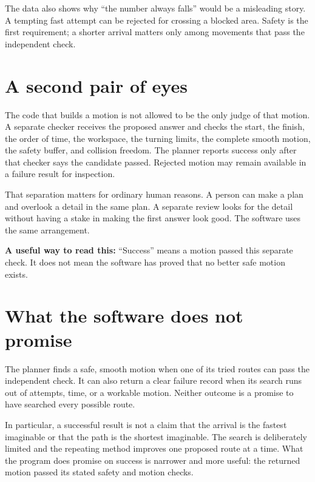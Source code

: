 \documentclass[10pt,letterpaper]{article}
\newcommand{\teachingnote}[1]{\begin{center}\begin{minipage}{.88\linewidth}\colorbox{papergray}{\parbox{.94\linewidth}{\small\textbf{A useful way to read this:} #1}}\end{minipage}\end{center}}
\begin{document}
The data also shows why ``the number always falls'' would be a misleading story.
A tempting fast attempt can be rejected for crossing a blocked area. Safety is
the first requirement; a shorter arrival matters only among movements that
pass the independent check.

\section{A second pair of eyes}

The code that builds a motion is not allowed to be the only judge of that
motion. A separate checker receives the proposed answer and checks the start,
the finish, the order of time, the workspace, the turning limits, the complete
smooth motion, the safety buffer, and collision freedom. The planner reports success only after that checker says the candidate passed.
Rejected motion may remain available in a failure result for inspection.

That separation matters for ordinary human reasons. A person can make a plan
and overlook a detail in the same plan. A separate review looks for the detail
without having a stake in making the first answer look good. The software uses
the same arrangement.

\teachingnote{``Success'' means a motion passed this separate check. It does not
mean the software has proved that no better safe motion exists.}

\section{What the software does not promise}

The planner finds a safe, smooth motion when one of its tried routes can pass
the independent check. It can also return a clear failure record when its
search runs out of attempts, time, or a workable motion. Neither outcome is a
promise to have searched every possible route.

In particular, a successful result is not a claim that the arrival is the
fastest imaginable or that the path is the shortest imaginable. The search is
deliberately limited and the repeating method improves one proposed route at a
time. What the program does promise on success is narrower and more useful:
the returned motion passed its stated safety and motion checks.

\clearpage

\end{document}
